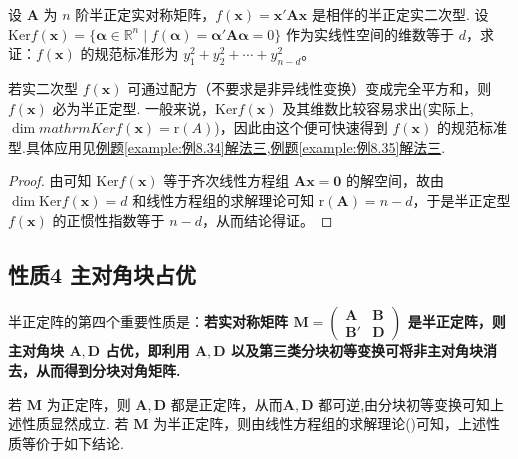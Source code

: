 \documentclass[../../main.tex]{subfiles}
\begin{document}
\begin{proposition}\label{proposition:利用核空间求半正定型的规范标准型}
设 $\boldsymbol{A}$ 为 $n$ 阶半正定实对称矩阵，$f(\boldsymbol{x})=\boldsymbol{x}'\boldsymbol{A}\boldsymbol{x}$ 是相伴的半正定实二次型. 设 $\mathrm{Ker} f(\boldsymbol{x}) =\{\boldsymbol{\alpha}\in\mathbb{R}^n\mid f(\boldsymbol{\alpha})=\boldsymbol{\alpha}'\boldsymbol{A}\boldsymbol{\alpha}=0\}$ 作为实线性空间的维数等于 $d$，求证：$f(\boldsymbol{x})$ 的规范标准形为 $y_1^2 + y_2^2+\cdots + y_{n - d}^2$。
\end{proposition}
\begin{remark}
若实二次型 $f(\boldsymbol{x})$ 可通过配方（不要求是非异线性变换）变成完全平方和，则 $f(\boldsymbol{x})$ 必为半正定型. 一般来说，$\mathrm{Ker} f(\boldsymbol{x})$ 及其维数比较容易求出(实际上,$\dim mathrm{Ker} f(\boldsymbol{x})=\mathrm{r}(A)$)，因此由这个便可快速得到 $f(\boldsymbol{x})$ 的规范标准型.具体应用见\hyperref[example:例8.34]{例题\ref{example:例8.34}解法三},\hyperref[example:例8.35]{例题\ref{example:例8.35}解法三}.
\end{remark}
\begin{proof}
由可知 $\mathrm{Ker} f(\boldsymbol{x})$ 等于齐次线性方程组 $\boldsymbol{A}\boldsymbol{x}=\boldsymbol{0}$ 的解空间，故由 $\dim\mathrm{Ker} f(\boldsymbol{x}) = d$ 和线性方程组的求解理论可知 $\mathrm{r}(\boldsymbol{A}) = n - d$，于是半正定型 $f(\boldsymbol{x})$ 的正惯性指数等于 $n - d$，从而结论得证。
\end{proof}


\subsection{性质4 主对角块占优}

半正定阵的第四个重要性质是：\textbf{若实对称矩阵 $\boldsymbol{M}=\begin{pmatrix}
\boldsymbol{A} & \boldsymbol{B} \\
\boldsymbol{B}' & \boldsymbol{D}
\end{pmatrix}$ 是半正定阵，则主对角块 $\boldsymbol{A},\boldsymbol{D}$ 占优，即利用 $\boldsymbol{A},\boldsymbol{D}$ 以及第三类分块初等变换可将非主对角块消去，从而得到分块对角矩阵.} 

若 $\boldsymbol{M}$ 为正定阵，则 $\boldsymbol{A},\boldsymbol{D}$ 都是正定阵，从而$\boldsymbol{A},\boldsymbol{D}$ 都可逆,由分块初等变换可知上述性质显然成立. 若 $\boldsymbol{M}$ 为半正定阵，则由线性方程组的求解理论()可知，上述性质等价于如下结论.
\end{document}
